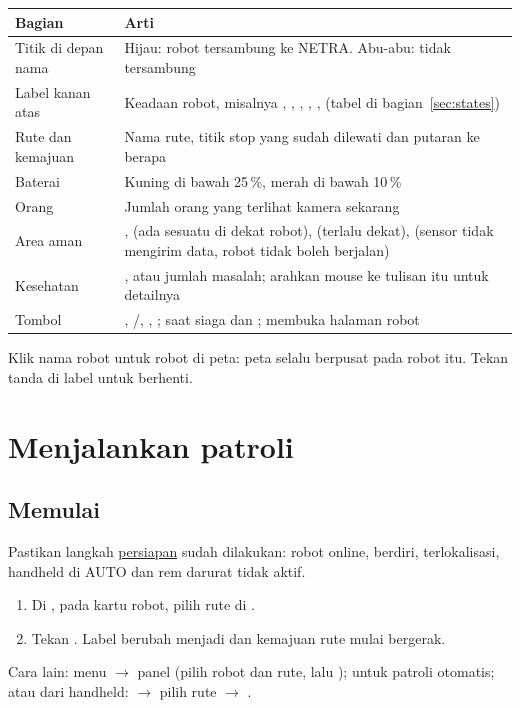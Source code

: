 \documentclass[11pt]{article}
\newcommand{\ra}{\ensuremath{\rightarrow}}
\begin{document}
\begin{tabularx}{\linewidth}{@{}B{3.4cm}Y@{}}
\toprule
Bagian & Arti \\
\midrule
Titik di depan nama & Hijau: robot tersambung ke NETRA. Abu-abu: tidak tersambung \\
Label kanan atas & Keadaan robot, misalnya , , , , ,  (tabel di bagian~\ref{sec:states}) \\
Rute dan kemajuan & Nama rute, titik stop yang sudah dilewati dan putaran ke berapa \\
Baterai & Kuning di bawah 25\,\%, merah di bawah 10\,\% \\
Orang & Jumlah orang yang terlihat kamera sekarang \\
Area aman & ,  (ada sesuatu di dekat robot),  (terlalu dekat),  (sensor tidak mengirim data, robot tidak boleh berjalan) \\
Kesehatan & , atau jumlah masalah; arahkan mouse ke tulisan itu untuk detailnya \\
Tombol & , /, , ; saat siaga  dan ;  membuka halaman robot \\
\bottomrule
\end{tabularx}

Klik nama robot untuk  robot di peta: peta selalu berpusat pada robot itu. Tekan tanda
\ui{\texttimes} di label  untuk berhenti.

\section{Menjalankan patroli}

\subsection{Memulai}
Pastikan langkah \hyperref[sec:prep]{persiapan} sudah dilakukan: robot online, berdiri, terlokalisasi,
handheld di AUTO dan rem darurat tidak aktif.

\begin{enumerate}
  \item Di , pada kartu robot, pilih rute di .
  \item Tekan . Label berubah menjadi  dan kemajuan rute mulai bergerak.
\end{enumerate}
Cara lain: menu  \ra{} panel  (pilih robot dan rute, lalu
);  untuk patroli otomatis; atau dari handheld:  \ra{} pilih rute
\ra{} .
\end{document}

